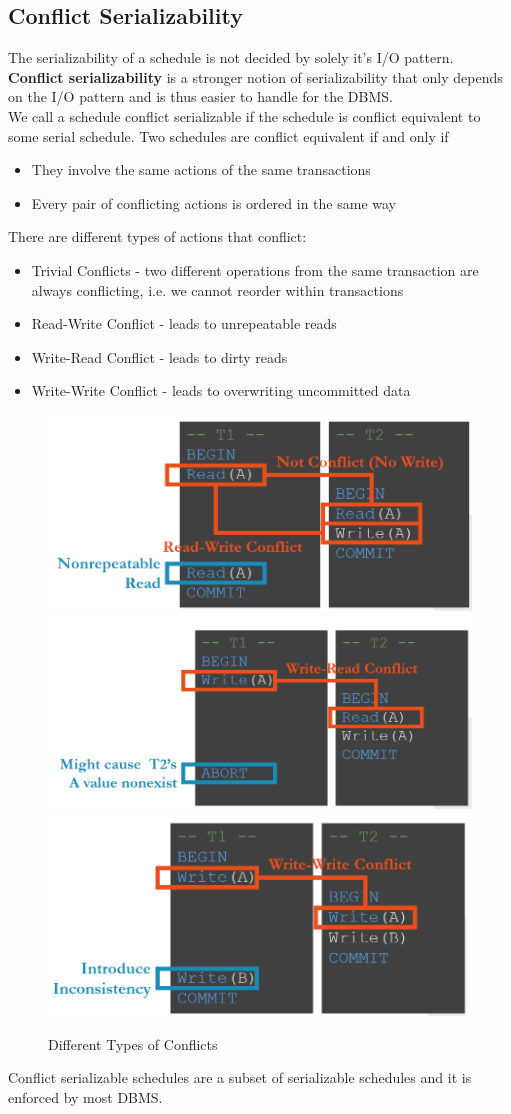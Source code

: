\subsection{Conflict Serializability}
The serializability of a schedule is not decided by solely it's I/O pattern. \textbf{Conflict serializability} is a stronger notion of serializability that only depends on the I/O pattern and is thus easier to handle for the DBMS. \\
We call a schedule conflict serializable if the schedule is conflict equivalent to some serial schedule. Two schedules are conflict equivalent if and only if
\begin{itemize}
\item They involve the same actions of the same transactions
\item Every pair of conflicting actions is ordered in the same way
\end{itemize}
There are different types of actions that conflict:
\begin{itemize}
\item Trivial Conflicts - two different operations from the same transaction are always conflicting, i.e. we cannot reorder within transactions
\item Read-Write Conflict - leads to unrepeatable reads
\item Write-Read Conflict - leads to dirty reads
\item Write-Write Conflict - leads to overwriting uncommitted data
\end{itemize}
\begin{figure}[H]
\centering
\includegraphics[width=.45\textwidth]{images/read-write.PNG}
\includegraphics[width=.45\textwidth]{images/read-read.PNG}
\includegraphics[width=.45\textwidth]{images/write-write.PNG}
\label{conflicts}
\caption{Different Types of Conflicts}
\end{figure}
Conflict serializable schedules are a subset of serializable schedules and it is enforced by most DBMS.

